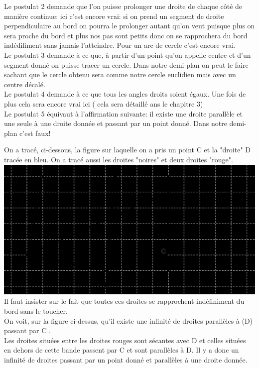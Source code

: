\documentclass[a4paper, 12pt, twoside]{book}
\begin{document}
   Le postulat 2 demande que l'on puisse prolonger une droite de chaque côté de manière continue: ici c'est encore vrai:  si on prend un segment de droite perpendiculaire au bord on pourra le prolonger autant qu'on veut puisque plus on sera proche du bord et plus nos pas sont petits donc on se rapprochera du bord indédifiment sans jamais l'atteindre. Pour un arc de cercle c'est encore vrai. \\
    
   Le postulat 3  demande à ce que, à partir d'un point qu'on appelle centre et d'un segment donné on puisse tracer un cercle. Dans notre demi-plan on peut le faire sachant que le cercle obtenu sera comme notre cercle euclidien mais avec un centre décalé.\\
   
Le postulat 4 demande à ce que tous les angles droits soient égaux. Une fois de plus cela sera encore vrai ici ( cela sera détaillé ans le chapitre 3)\\


Le postulat 5 équivaut à l'affirmation suivante: il existe une droite parallèle et une seule à une droite donnée et passant par un point donné. Dans notre demi- plan c'est faux! 

On a tracé, ci-dessous, la figure  sur laquelle on a pris un point C et la "droite" D tracée en bleu. On a tracé aussi les droites "noires" et deux droites "rouge".\\


 \includegraphics[scale=0.2]{figures/lobat50.eps} \\
 
 
 Il faut insister sur le fait que toutes ces droites se rapprochent indéfiniment  du bord sans le toucher. \\

 
 
    On voit, sur la figure ci-dessus, qu'il existe une infinité de droites parallèles à (D) passant par C . \\
    Les droites situées entre les droites rouges sont sécantes avec D et celles situées en dehors de cette bande passent par C et sont parallèles à D. Il y a donc un infinité de droites passant par un point donné et parallèles à une droite donnée.
    
\end{document}

